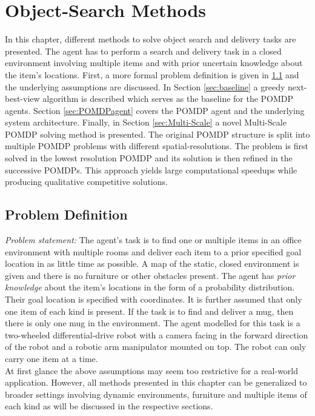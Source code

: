 \chapter{Object-Search Methods}
\label{sec:object_search}
In this chapter, different methods to solve object search and delivery tasks are presented. The agent has to perform a search and delivery task in a closed environment involving multiple items and with prior uncertain knowledge about the item's locations. First, a more formal problem definition is given in \ref{sec:problemdef} and the underlying assumptions are discussed. In Section \ref{sec:baseline} a greedy next-best-view algorithm is described which serves as the baseline for the POMDP agents. Section \ref{sec:POMDPagent} covers the POMDP agent and the underlying system architecture. Finally, in Section \ref{sec:Multi-Scale} a novel Multi-Scale POMDP solving method is presented. The original POMDP structure is split into multiple POMDP problems with different spatial-resolutions. The problem is first solved in the lowest resolution POMDP and its solution is then refined in the successive POMDPs. This approach yields large computational speedups while producing qualitative competitive solutions.  

\section{Problem Definition}\label{sec:problemdef}
\textit{Problem statement:} 
The agent's task is to find one or multiple items in an office environment with multiple rooms and deliver each item to a prior specified goal location in as little time as possible. A map of the static, closed environment is given and there is no furniture or other obstacles present. The agent has \textit{prior knowledge} about the item's locations in the form of a probability distribution. Their goal location is specified with coordinates. It is further assumed that only one item of each kind is present. If the task is to find and deliver a mug, then there is only one mug in the environment. The agent modelled for this task is a two-wheeled differential-drive robot with a camera facing in the forward direction of the robot and a robotic arm manipulator mounted on top. The robot can only carry one item at a time.\\

At first glance the above assumptions may seem too restrictive for a real-world application. However, all methods presented in this chapter can be generalized to broader settings involving dynamic environments, furniture and multiple items of each kind as will be discussed in the respective sections.
